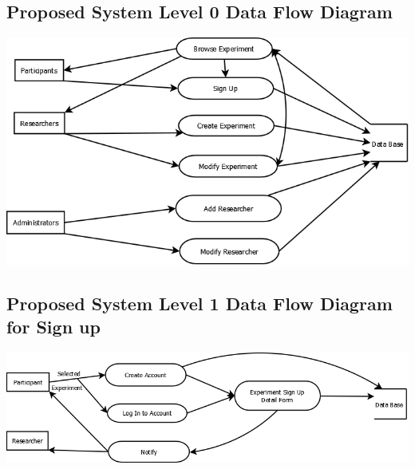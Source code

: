\subsection{Proposed System Level 0 Data Flow Diagram}
\includegraphics[width=6in]{../other/data-flow-diagrams/new_system_level_0.png}\\

\subsection{Proposed System Level 1 Data Flow Diagram for Sign up}
\includegraphics[width=6in]{../other/data-flow-diagrams/new_system_level_21.png}